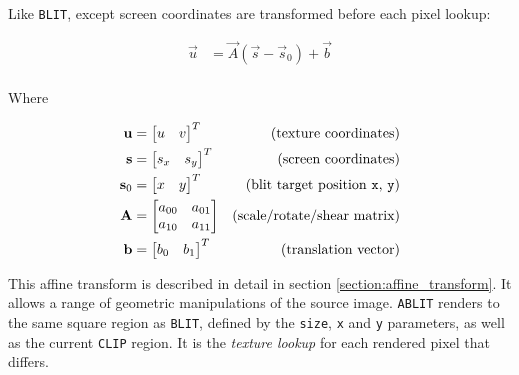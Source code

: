 Like {\tt BLIT}, except screen coordinates are transformed before each pixel lookup:

\begin{align*}
\vec{u}   &= \vec{A}(\vec{s} - \vec{s}_0) + \vec{b} \\
\end{align*}

Where

\begin{align*}
\vec{u}   &= \begin{bmatrix}u & v \\ \end{bmatrix}^T & \textup{(texture coordinates)} \\
\vec{s}   &= \begin{bmatrix}s_x & s_y \\ \end{bmatrix}^T & \textup{(screen coordinates)} \\
\vec{s}_0 &= \begin{bmatrix}x & y \\ \end{bmatrix}^T & \textup{(blit target position {\tt x}, {\tt y})} \\
\vec{A}   &= \begin{bmatrix}a_{00} & a_{01} \\ a_{10} & a_{11} \end{bmatrix} & \textup{(scale/rotate/shear matrix)} \\
\vec{b}   &= \begin{bmatrix}b_0 & b_1 \\ \end{bmatrix}^T & \textup{(translation vector)} \\
\end{align*}

This affine transform is described in detail in section \ref{section:affine_transform}. It allows a range of geometric manipulations of the source image. {\tt ABLIT} renders to the same square region as {\tt BLIT}, defined by the {\tt size}, {\tt x} and {\tt y} parameters, as well as the current {\tt CLIP} region. It is the {\it texture lookup} for each rendered pixel that differs.


